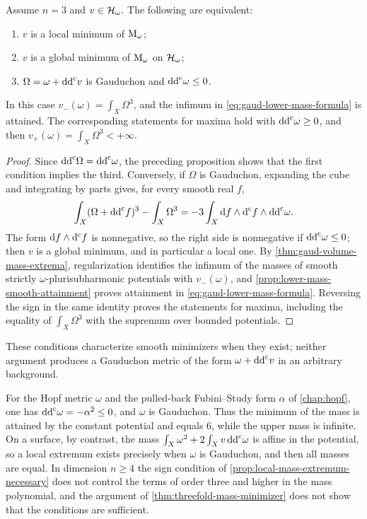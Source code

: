 \begin{theorem}\label{thm:threefold-mass-minimizer}
Assume $n=3$ and $v\in\mathcal H_\omega$. The following are equivalent:
\begin{enumerate}
\item $v$ is a local minimum of $\mathrm M_\omega$;
\item $v$ is a global minimum of $\mathrm M_\omega$ on $\mathcal H_\omega$;
\item $\Omega=\omega+\mathrm{dd}^{\mathrm{c}} v$ is Gauduchon and $\mathrm{dd}^{\mathrm{c}}\omega\leq0$.
\end{enumerate}
In this case $v_-(\omega)=\int_X\Omega^3$, and the infimum in \eqref{eq:gaud-lower-mass-formula} is attained. The corresponding statements for maxima hold with $\mathrm{dd}^{\mathrm{c}}\omega\geq0$, and then $v_+(\omega)=\int_X\Omega^3<+\infty$.
\end{theorem}
\begin{proof}
Since $\mathrm{dd}^{\mathrm{c}}\Omega=\mathrm{dd}^{\mathrm{c}}\omega$, the preceding proposition shows that the first condition implies the third. Conversely, if $\Omega$ is Gauduchon, expanding the cube and integrating by parts gives, for every smooth real $f$,
\begin{equation}\label{eq:threefold-mass-dirichlet}
 \int_X(\Omega+\mathrm{dd}^{\mathrm{c}} f)^3-\int_X\Omega^3
       =-3\int_X\mathrm{d}f\wedge\mathrm d^{\mathrm c} f\wedge\mathrm{dd}^{\mathrm{c}}\omega.
\end{equation}
The form $\mathrm{d}f\wedge\mathrm d^{\mathrm c} f$ is nonnegative, so the right side is nonnegative if $\mathrm{dd}^{\mathrm{c}}\omega\leq0$; then $v$ is a global minimum, and in particular a local one. By \cref{thm:gaud-volume-mass-extrema}, regularization identifies the infimum of the masses of smooth strictly $\omega$-plurisubharmonic potentials with $v_-(\omega)$, and \cref{prop:lower-mass-smooth-attainment} proves attainment in \eqref{eq:gaud-lower-mass-formula}. Reversing the sign in the same identity proves the statements for maxima, including the equality of $\int_X\Omega^3$ with the supremum over bounded potentials.
\end{proof}

These conditions characterize smooth minimizers when they exist; neither argument produces a Gauduchon metric of the form $\omega+\mathrm{dd}^{\mathrm{c}} v$ in an arbitrary background.

For the Hopf metric $\omega$ and the pulled-back Fubini--Study form $\alpha$ of \cref{chap:hopf}, one has $\mathrm{dd}^{\mathrm{c}}\omega=-\alpha^2\leq0$, and $\omega$ is Gauduchon. Thus the minimum of the mass is attained by the constant potential and equals $6$, while the upper mass is infinite. On a surface, by contrast, the mass $\int_X\omega^2+2\int_Xv\,\mathrm{dd}^{\mathrm{c}}\omega$ is affine in the potential, so a local extremum exists precisely when $\omega$ is Gauduchon, and then all masses are equal. In dimension $n\geq4$ the sign condition of \cref{prop:local-mass-extremum-necessary} does not control the terms of order three and higher in the mass polynomial, and the argument of \cref{thm:threefold-mass-minimizer} does not show that the conditions are sufficient.
